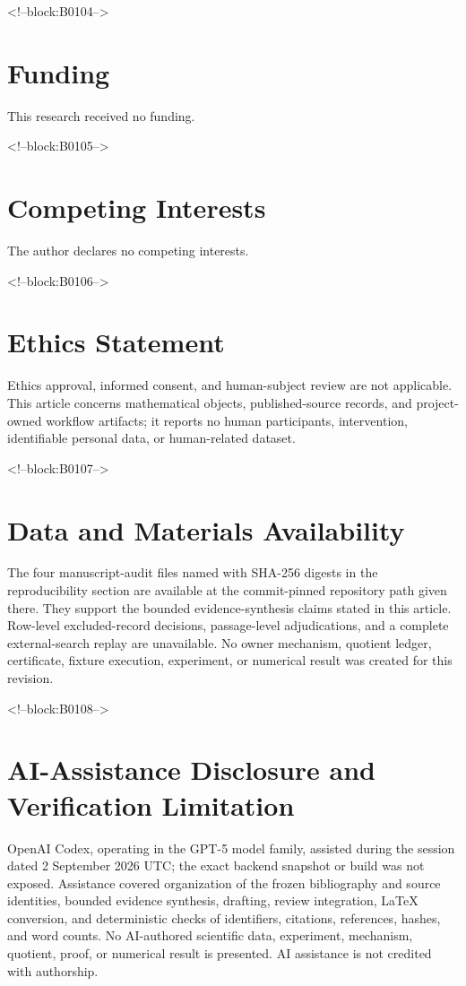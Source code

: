 \documentclass[11pt,a4paper]{article}
\begin{document}
<!--block:B0104-->
\section*{Funding}
This research received no funding.

<!--block:B0105-->
\section*{Competing Interests}
The author declares no competing interests.

<!--block:B0106-->
\section*{Ethics Statement}
Ethics approval, informed consent, and human-subject review are not applicable. This article concerns mathematical objects, published-source records, and project-owned workflow artifacts; it reports no human participants, intervention, identifiable personal data, or human-related dataset.

<!--block:B0107-->
\section*{Data and Materials Availability}
The four manuscript-audit files named with SHA-256 digests in the reproducibility section are available at the commit-pinned repository path given there. They support the bounded evidence-synthesis claims stated in this article. Row-level excluded-record decisions, passage-level adjudications, and a complete external-search replay are unavailable. No owner mechanism, quotient ledger, certificate, fixture execution, experiment, or numerical result was created for this revision.

<!--block:B0108-->
\section*{AI-Assistance Disclosure and Verification Limitation}
OpenAI Codex, operating in the GPT-5 model family, assisted during the session dated 2 September 2026 UTC; the exact backend snapshot or build was not exposed. Assistance covered organization of the frozen bibliography and source identities, bounded evidence synthesis, drafting, review integration, LaTeX conversion, and deterministic checks of identifiers, citations, references, hashes, and word counts. No AI-authored scientific data, experiment, mechanism, quotient, proof, or numerical result is presented. AI assistance is not credited with authorship.
\end{document}
